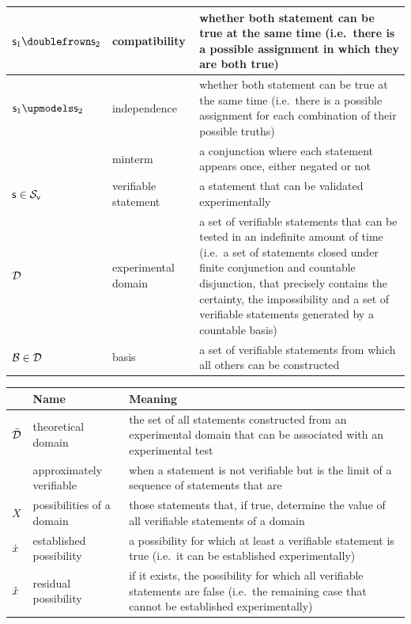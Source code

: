 \begin{tabular}{p{} p{} p{}}
		\hline 
		$\stmt_1 \comp \stmt_2$ & compatibility & whether both statement can be true at the same time (i.e.~there is a possible assignment in which they are both true) \\
		\hline 
		$\stmt_1 \indep \stmt_2$ & independence & whether both statement can be true at the same time (i.e.~there is a possible assignment for each combination of their possible truths) \\
		\hline 
		& minterm & a conjunction where each statement appears once, either negated or not \\
		\hline 
		$\mathsf{s} \in \mathcal{S}_\textsf{v}$ & verifiable statement & a statement that can be validated experimentally\\ 
		\hline 
		$\mathcal{D}$ & experimental domain & a set of verifiable statements that can be tested in an indefinite amount of time (i.e.~a set of statements closed under finite conjunction and countable disjunction, that precisely contains the certainty, the impossibility and a set of verifiable statements generated by a countable basis) \\ 
		\hline 
		$\mathcal{B} \in \mathcal{D}$ & basis & a set of verifiable statements from which all others can be constructed\\ 
		
	\end{tabular} 
	
	\newpage
	
	\begin{tabular}{p{} p{} p{}}
		& Name & Meaning  \\ 
		\hline 
		$\bar{\mathcal{D}}$ & theoretical domain & the set of all statements constructed from an experimental domain that can be associated with an experimental test\\ 
		\hline 
		& approximately verifiable & when a statement is not verifiable but is the limit of a sequence of statements that are\\ 
		\hline 
		$X$ & possibilities of a domain & those statements that, if true, determine the value of all verifiable statements of a domain\\ 
		\hline 
		$\dot{x}$ & established possibility & a possibility for which at least a verifiable statement is true (i.e.~it can be established experimentally)\\ 
		\hline 
		$\mathring{x}$ & residual possibility & if it exists, the possibility for which all verifiable statements are false (i.e.~the remaining case that cannot be established experimentally)\\ 
		
	\end{tabular} 
	

